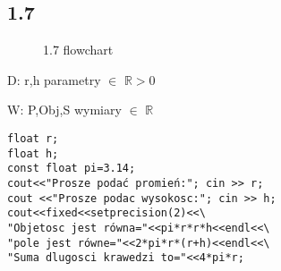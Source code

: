 \documentclass[a4paper,11pt]{article}
\begin{document}
\subsection*{1.7}
\begin{multicols}{2}
  \begin{flushleft}
    \begin{figure}[H]
    \centering  
{}
    \caption{1.7 flowchart}
    \label{flow7}
\end{figure}
    \end{flushleft}
 D: r,h parametry $\in$ $\mathbb{R}>0$
 
 W: P,Obj,S wymiary $\in$ $\mathbb{R}$
    \begin{flushright}
    \begin{verbatim}
float r;
float h;
const float pi=3.14;
cout<<"Prosze podać promień:"; cin >> r;
cout <<"Prosze podac wysokosc:"; cin >> h;
cout<<fixed<<setprecision(2)<<\
"Objetosc jest równa="<<pi*r*r*h<<endl<<\
"pole jest równe="<<2*pi*r*(r+h)<<endl<<\
"Suma dlugosci krawedzi to="<<4*pi*r;
\end{verbatim}
    \end{flushright}
\end{multicols}
\end{document}

